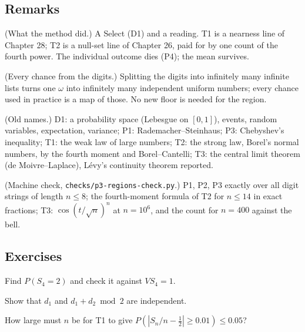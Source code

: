 \subsection*{Remarks}

\begin{lines}
\item[\lab{R1}] (What the method did.) A Select (D1) and a reading. T1 is a nearness line of Chapter 28; T2 is a null-set line of Chapter 26, paid for by one count of the fourth power. The individual outcome dies (P4); the mean survives.
\item[\lab{R2}] (Every chance from the digits.) Splitting the digits into infinitely many infinite lists turns one $\omega$ into infinitely many independent uniform numbers; every chance used in practice is a map of those. No new floor is needed for the region.
\item[\lab{R3}] (Old names.) D1: a probability space (Lebesgue on $[0, 1]$), events, random variables, expectation, variance; P1: Rademacher--Steinhaus; P3: Chebyshev's inequality; T1: the weak law of large numbers; T2: the strong law, Borel's normal numbers, by the fourth moment and Borel--Cantelli; T3: the central limit theorem (de Moivre--Laplace), L\'evy's continuity theorem reported.
\item[\lab{R4}] (Machine check, \texttt{checks/p3-regions-check.py}.) P1, P2, P3 exactly over all digit strings of length $n \le 8$; the fourth-moment formula of T2 for $n \le 14$ in exact fractions; T3: $\cos(t/\sqrt n)^n$ at $n = 10^6$, and the count for $n = 400$ against the bell.
\end{lines}

\subsection*{Exercises}

\begin{lines}
\item[\lab{E1}] Find $P(S_4 = 2)$ and check it against $V S_4 = 1$.
\item[\lab{E2}] Show that $d_1$ and $d_1 + d_2 \bmod 2$ are independent.
\item[\lab{E3}] How large must $n$ be for T1 to give $P(|S_n/n - \tfrac12| \ge 0.01) \le 0.05$?
\end{lines}

\newpage

